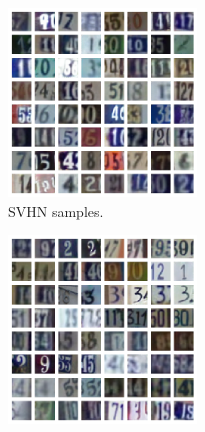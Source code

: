 \documentclass{article}
\newcommand{\figureHeight}{5cm}
\begin{document}
\begin{figure}[p]
    \centering
    \begin{subfigure}[t]{0.49\textwidth}
        \centering
        \includegraphics[height=\figureHeight]{svhn_samples.png}
        \caption{\label{fig:svhn_samples} SVHN samples.}
    \end{subfigure}
    \hfill
    \begin{subfigure}[t]{0.49\textwidth}
        \centering
        \includegraphics[height=\figureHeight]{svhn_reconstructions.png}

\end{subfigure}
\end{figure}
\end{document}
